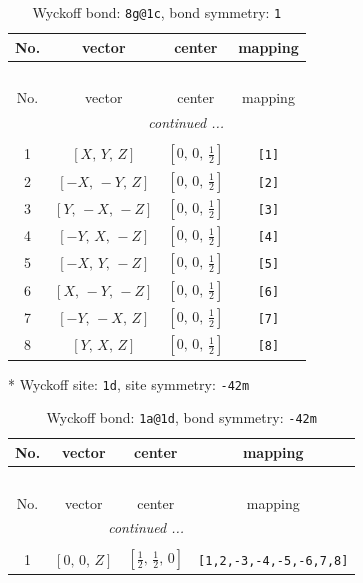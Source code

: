 \documentclass[fleqn,8pt]{jsarticle}
\begin{document}
\begin{longtable}{cccc}
\caption{Wyckoff bond: {\tt 8g@1c}, bond symmetry: {\tt 1}}
 \\
 \hline \hline
No. & vector & center & mapping \\ \hline \endfirsthead

\multicolumn{3}{l}{\tablename\ \thetable{}} \\
 \hline \hline
No. & vector & center & mapping \\ \hline \endhead

 \hline \hline
\multicolumn{3}{r}{\footnotesize\it continued ...} \\ \endfoot

 \hline \hline
\multicolumn{3}{r}{} \\ \endlastfoot

1 & $\left[ X,\, Y,\, Z \right]$ & $\left[ 0,\, 0,\, \frac{1}{2} \right]$ & {\tt [1]} \\ \hline
2 & $\left[ - X,\, - Y,\, Z \right]$ & $\left[ 0,\, 0,\, \frac{1}{2} \right]$ & {\tt [2]} \\ \hline
3 & $\left[ Y,\, - X,\, - Z \right]$ & $\left[ 0,\, 0,\, \frac{1}{2} \right]$ & {\tt [3]} \\ \hline
4 & $\left[ - Y,\, X,\, - Z \right]$ & $\left[ 0,\, 0,\, \frac{1}{2} \right]$ & {\tt [4]} \\ \hline
5 & $\left[ - X,\, Y,\, - Z \right]$ & $\left[ 0,\, 0,\, \frac{1}{2} \right]$ & {\tt [5]} \\ \hline
6 & $\left[ X,\, - Y,\, - Z \right]$ & $\left[ 0,\, 0,\, \frac{1}{2} \right]$ & {\tt [6]} \\ \hline
7 & $\left[ - Y,\, - X,\, Z \right]$ & $\left[ 0,\, 0,\, \frac{1}{2} \right]$ & {\tt [7]} \\ \hline
8 & $\left[ Y,\, X,\, Z \right]$ & $\left[ 0,\, 0,\, \frac{1}{2} \right]$ & {\tt [8]} \\
\end{longtable}
* Wyckoff site: {\tt 1d}, site symmetry: {\tt -42m}
\renewcommand{\arraystretch}{1.2}
\begin{longtable}{cccc}
\caption{Wyckoff bond: {\tt 1a@1d}, bond symmetry: {\tt -42m}}
 \\
 \hline \hline
No. & vector & center & mapping \\ \hline \endfirsthead

\multicolumn{3}{l}{\tablename\ \thetable{}} \\
 \hline \hline
No. & vector & center & mapping \\ \hline \endhead

 \hline \hline
\multicolumn{3}{r}{\footnotesize\it continued ...} \\ \endfoot

 \hline \hline
\multicolumn{3}{r}{} \\ \endlastfoot

1 & $\left[ 0,\, 0,\, Z \right]$ & $\left[ \frac{1}{2},\, \frac{1}{2},\, 0 \right]$ & {\tt [1,2,-3,-4,-5,-6,7,8]} \\
\end{longtable}
\end{document}
